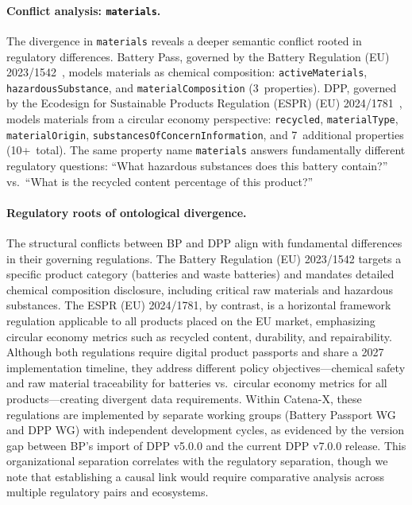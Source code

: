 \documentclass[]{ceurart}
\begin{document}
\paragraph{Conflict analysis: \texttt{materials}.}
The divergence in \texttt{materials} reveals a deeper semantic conflict
rooted in regulatory differences. Battery Pass, governed by the Battery
Regulation (EU) 2023/1542~\cite{eu2023battery}, models materials as
chemical composition: \texttt{activeMaterials}, \texttt{hazardousSubstance},
and \texttt{materialComposition} (3~properties). DPP, governed by the
Ecodesign for Sustainable Products Regulation (ESPR) (EU)
2024/1781~\cite{eu2024espr}, models materials from a circular economy
perspective: \texttt{recycled}, \texttt{materialType},
\texttt{materialOrigin}, \texttt{substancesOfConcernInformation}, and
7~additional properties (10+~total). The same property name
\texttt{materials} answers fundamentally different regulatory questions:
``What hazardous substances does this battery contain?'' vs.\ ``What is the
recycled content percentage of this product?''

\paragraph{Regulatory roots of ontological divergence.}
The structural conflicts between BP and DPP align with fundamental
differences in their governing regulations. The Battery Regulation (EU)
2023/1542 targets a specific product category (batteries and waste
batteries) and mandates detailed chemical composition disclosure,
including critical raw materials and hazardous substances. The ESPR (EU)
2024/1781, by contrast, is a horizontal framework regulation applicable
to all products placed on the EU market, emphasizing circular economy
metrics such as recycled content, durability, and repairability. Although
both regulations require digital product passports and share a 2027
implementation timeline, they address different policy objectives---chemical
safety and raw material traceability for batteries vs.\ circular economy
metrics for all products---creating divergent data requirements.
Within Catena-X, these regulations are implemented by separate working
groups (Battery Passport WG and DPP WG) with independent development
cycles, as evidenced by the version gap between BP's import of DPP
v5.0.0 and the current DPP v7.0.0 release. This organizational
separation correlates with the regulatory separation, though we note
that establishing a causal link would require comparative analysis
across multiple regulatory pairs and ecosystems.
\end{document}
